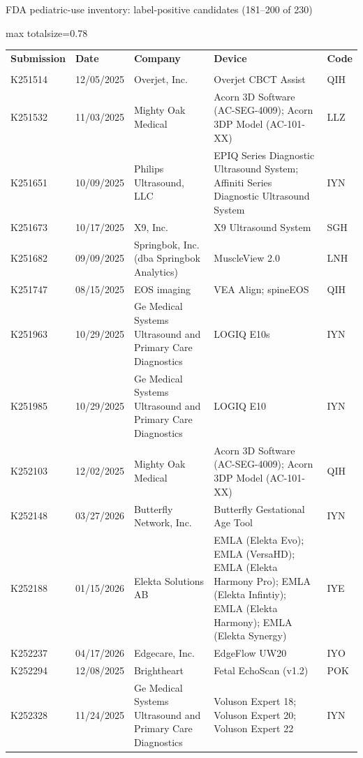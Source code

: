 \documentclass[aspectratio=169]{beamer}
\renewcommand{\arraystretch}{1.08}
\begin{document}
\begin{frame}[category=FDA appendix]{FDA pediatric-use inventory: label-positive candidates (181--200 of 230)}
\begin{adjustbox}{max totalsize={\textwidth}{0.78\textheight}}
\renewcommand{\arraystretch}{1.2}
\begin{tabular}{|p{}|p{}|p{}|p{}|p{}|}
\hline \textbf{Submission} & \textbf{Date} & \textbf{Company} & \textbf{Device} & \textbf{Code} \\\\ \hline
K251514 & 12/05/2025 & Overjet, Inc. & Overjet CBCT Assist & QIH \\ \hline
K251532 & 11/03/2025 & Mighty Oak Medical & Acorn 3D Software (AC-SEG-4009); Acorn 3DP Model (AC-101-XX) & LLZ \\ \hline
K251651 & 10/09/2025 & Philips Ultrasound, LLC & EPIQ Series Diagnostic Ultrasound System; Affiniti Series Diagnostic Ultrasound System & IYN \\ \hline
K251673 & 10/17/2025 & X9, Inc. & X9 Ultrasound System & SGH \\ \hline
K251682 & 09/09/2025 & Springbok, Inc. (dba Springbok Analytics) & MuscleView 2.0 & LNH \\ \hline
K251747 & 08/15/2025 & EOS imaging & VEA Align; spineEOS & QIH \\ \hline
K251963 & 10/29/2025 & Ge Medical Systems Ultrasound and Primary Care Diagnostics & LOGIQ E10s & IYN \\ \hline
K251985 & 10/29/2025 & Ge Medical Systems Ultrasound and Primary Care Diagnostics & LOGIQ E10 & IYN \\ \hline
K252103 & 12/02/2025 & Mighty Oak Medical & Acorn 3D Software (AC-SEG-4009); Acorn 3DP Model (AC-101-XX) & QIH \\ \hline
K252148 & 03/27/2026 & Butterfly Network, Inc. & Butterfly Gestational Age Tool & IYN \\ \hline
K252188 & 01/15/2026 & Elekta Solutions AB & EMLA (Elekta Evo); EMLA (VersaHD); EMLA (Elekta Harmony Pro); EMLA (Elekta Infintiy); EMLA (Elekta Harmony); EMLA (Elekta Synergy) & IYE \\ \hline
K252237 & 04/17/2026 & Edgecare, Inc. & EdgeFlow UW20 & IYO \\ \hline
K252294 & 12/08/2025 & Brightheart & Fetal EchoScan (v1.2) & POK \\ \hline
K252328 & 11/24/2025 & Ge Medical Systems Ultrasound and Primary Care Diagnostics & Voluson Expert 18; Voluson Expert 20; Voluson Expert 22 & IYN \\ \hline

\end{tabular}
\end{adjustbox}
\end{frame}
\end{document}
